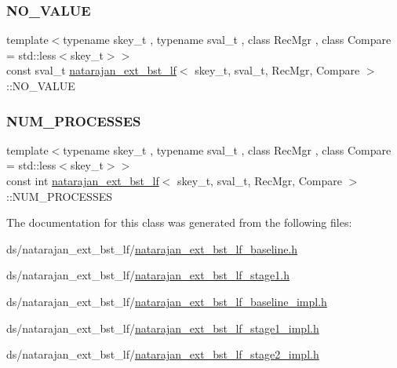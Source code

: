 \subsubsection{\texorpdfstring{N\+O\+\_\+\+V\+A\+L\+UE}{NO\_VALUE}}
{\footnotesize\ttfamily template$<$typename skey\+\_\+t , typename sval\+\_\+t , class Rec\+Mgr , class Compare  = std\+::less$<$skey\+\_\+t$>$$>$ \\
const sval\+\_\+t \hyperlink{classnatarajan__ext__bst__lf}{natarajan\+\_\+ext\+\_\+bst\+\_\+lf}$<$ skey\+\_\+t, sval\+\_\+t, Rec\+Mgr, Compare $>$\+::N\+O\+\_\+\+V\+A\+L\+UE}

\mbox{\label{classnatarajan__ext__bst__lf_aeea14767b18273f70c60eb5f476c4ee5}} 
\subsubsection{\texorpdfstring{N\+U\+M\+\_\+\+P\+R\+O\+C\+E\+S\+S\+ES}{NUM\_PROCESSES}}
{\footnotesize\ttfamily template$<$typename skey\+\_\+t , typename sval\+\_\+t , class Rec\+Mgr , class Compare  = std\+::less$<$skey\+\_\+t$>$$>$ \\
const int \hyperlink{classnatarajan__ext__bst__lf}{natarajan\+\_\+ext\+\_\+bst\+\_\+lf}$<$ skey\+\_\+t, sval\+\_\+t, Rec\+Mgr, Compare $>$\+::N\+U\+M\+\_\+\+P\+R\+O\+C\+E\+S\+S\+ES}



The documentation for this class was generated from the following files\+:\begin{DoxyCompactItemize}
\item 
ds/natarajan\+\_\+ext\+\_\+bst\+\_\+lf/\hyperlink{natarajan__ext__bst__lf__baseline_8h}{natarajan\+\_\+ext\+\_\+bst\+\_\+lf\+\_\+baseline.\+h}\item 
ds/natarajan\+\_\+ext\+\_\+bst\+\_\+lf/\hyperlink{natarajan__ext__bst__lf__stage1_8h}{natarajan\+\_\+ext\+\_\+bst\+\_\+lf\+\_\+stage1.\+h}\item 
ds/natarajan\+\_\+ext\+\_\+bst\+\_\+lf/\hyperlink{natarajan__ext__bst__lf__baseline__impl_8h}{natarajan\+\_\+ext\+\_\+bst\+\_\+lf\+\_\+baseline\+\_\+impl.\+h}\item 
ds/natarajan\+\_\+ext\+\_\+bst\+\_\+lf/\hyperlink{natarajan__ext__bst__lf__stage1__impl_8h}{natarajan\+\_\+ext\+\_\+bst\+\_\+lf\+\_\+stage1\+\_\+impl.\+h}\item 
ds/natarajan\+\_\+ext\+\_\+bst\+\_\+lf/\hyperlink{natarajan__ext__bst__lf__stage2__impl_8h}{natarajan\+\_\+ext\+\_\+bst\+\_\+lf\+\_\+stage2\+\_\+impl.\+h}\end{DoxyCompactItemize}
